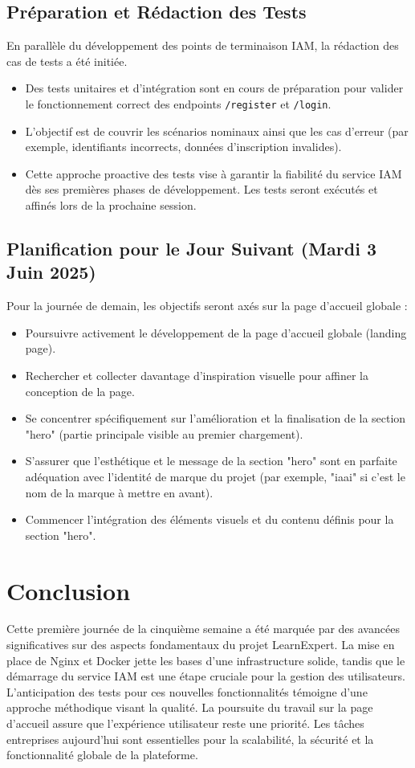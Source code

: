 \documentclass[12pt, a4paper]{article}
\begin{document}
\subsection{Préparation et Rédaction des Tests}
En parallèle du développement des points de terminaison IAM, la rédaction des cas de tests a été initiée.
\begin{itemize}
    \item Des tests unitaires et d'intégration sont en cours de préparation pour valider le fonctionnement correct des endpoints \texttt{/register} et \texttt{/login}.
    \item L'objectif est de couvrir les scénarios nominaux ainsi que les cas d'erreur (par exemple, identifiants incorrects, données d'inscription invalides).
    \item Cette approche proactive des tests vise à garantir la fiabilité du service IAM dès ses premières phases de développement. Les tests seront exécutés et affinés lors de la prochaine session.
\end{itemize}


\subsection{Planification pour le Jour Suivant (Mardi 3 Juin 2025)} %
Pour la journée de demain, les objectifs seront axés sur la page d'accueil globale :
\begin{itemize}
  \item Poursuivre activement le développement de la page d'accueil globale (landing page).
  \item Rechercher et collecter davantage d'inspiration visuelle pour affiner la conception de la page.
  \item Se concentrer spécifiquement sur l'amélioration et la finalisation de la section "hero" (partie principale visible au premier chargement).
  \item S'assurer que l'esthétique et le message de la section "hero" sont en parfaite adéquation avec l'identité de marque du projet (par exemple, "iaai" si c'est le nom de la marque à mettre en avant).
  \item Commencer l'intégration des éléments visuels et du contenu définis pour la section "hero".
\end{itemize}

\section{Conclusion}
Cette première journée de la cinquième semaine a été marquée par des avancées significatives sur des aspects fondamentaux du projet LearnExpert. La mise en place de Nginx et Docker jette les bases d'une infrastructure solide, tandis que le démarrage du service IAM est une étape cruciale pour la gestion des utilisateurs. L'anticipation des tests pour ces nouvelles fonctionnalités témoigne d'une approche méthodique visant la qualité. La poursuite du travail sur la page d'accueil assure que l'expérience utilisateur reste une priorité. Les tâches entreprises aujourd'hui sont essentielles pour la scalabilité, la sécurité et la fonctionnalité globale de la plateforme.
\end{document}
